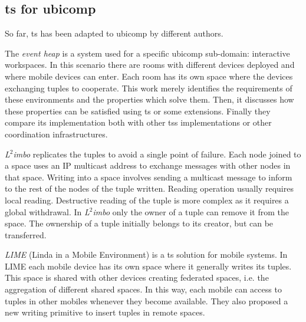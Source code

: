 \subsection{\acl{ts} for \ac{ubicomp}}
\label{sec:soa_ts_ubicomp}

So far, \acl{ts} has been adapted to \acl{ubicomp} by different authors.




The \emph{event heap} \citep{johanson_extending_2004} is a system used for a specific \ac{ubicomp} sub-domain: interactive workspaces.
In this scenario there are rooms with different devices deployed and where mobile devices can enter.
Each room has its own space where the devices exchanging tuples to cooperate.
This work merely identifies the requirements of these environments and the properties which solve them.
Then, it discusses how these properties can be satisfied using \ac{ts} or some extensions.
Finally they compare its implementation both with other \acp{ts} implementations or other coordination infrastructures. %


\emph{L$^2$imbo} \citep{davies_l2imbo:_1998,friday_experiences_1999} replicates the tuples to avoid a single point of failure.
Each node joined to a space uses an IP multicast address to exchange messages with other nodes in that space.
Writing into a space involves sending a multicast message to inform to the rest of the nodes of the tuple written.
Reading operation usually requires local reading.
Destructive reading of the tuple is more complex as it requires a global withdrawal.
In \emph{L$^2$imbo} only the owner of a tuple can remove it from the space.
The ownership of a tuple initially belongs to its creator, but can be transferred. %


\emph{LIME} (Linda in a Mobile Environment) \citep{picco_lime:_1999} is a \ac{ts} solution for mobile systems.
In LIME each mobile device has its own space where it generally writes its tuples.
This space is shared with other devices creating federated spaces, i.e. the aggregation of different shared spaces.
In this way, each mobile can access to tuples in other mobiles whenever they become available.
They also proposed a new writing primitive to insert tuples in remote spaces.

